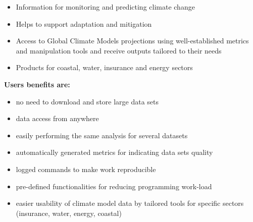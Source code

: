 \documentclass[portrait,a0paper,fontscale=0.4]{baposter} %
\newcommand{\compresslist}{%
\setlength{\itemsep}{1pt}%
\setlength{\parskip}{0pt}%
\setlength{\parsep}{0pt}%
}
\begin{document}
\begin{poster}
{  \begin{itemize}\compresslist
    \item Information for monitoring and predicting climate change
    \item Helps to support adaptation and mitigation
    \item Access to Global Climate Models projections using well-established
      metrics and manipulation tools and receive outputs
      tailored to their needs
    \item Products for coastal, water, insurance and energy sectors
  \end{itemize}

  {\bf Users benefits are:}
  \begin{itemize}\compresslist
    \item no need to download and store large data sets
    \item data access from anywhere
    \item easily performing the same analysis for several datasets
    \item automatically generated metrics for indicating data sets quality
    \item logged commands to make work reproducible
    \item pre-defined functionalities for reducing programming work-load
    \item easier usability of climate model data by tailored tools
      for specific sectors (insurance, water, energy, coastal)
  \end{itemize}
}


\end{poster}
\end{document}
